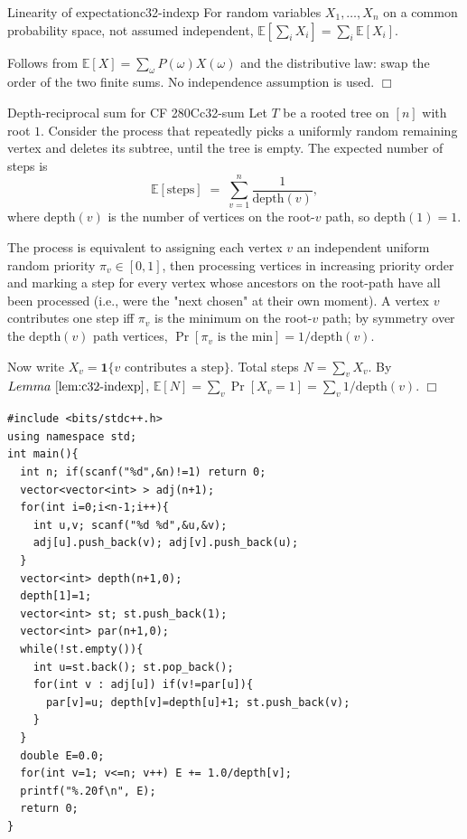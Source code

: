\begin{lemma}{Linearity of expectation}{c32-indexp}
For random variables \(X_1,\dots,X_n\) on a common probability space, not
assumed independent, \(\mathbb{E}\!\left[\sum_i X_i\right]=\sum_i
\mathbb{E}[X_i]\).
\end{lemma}

\begin{proofbox}
Follows from \(\mathbb{E}[X]=\sum_{\omega} P(\omega) X(\omega)\) and the
distributive law: swap the order of the two finite sums.  No independence
assumption is used. \(\Box\)
\end{proofbox}

\begin{theorem}{Depth-reciprocal sum for CF 280C}{c32-sum}
Let \(T\) be a rooted tree on \([n]\) with root \(1\).  Consider the process
that repeatedly picks a uniformly random remaining vertex and deletes its
subtree, until the tree is empty.  The expected number of steps is
\[
  \mathbb{E}[\text{steps}] \;=\; \sum_{v=1}^{n} \frac{1}{\mathrm{depth}(v)},
\]
where \(\mathrm{depth}(v)\) is the number of vertices on the root-\(v\)
path, so \(\mathrm{depth}(1)=1\).
\end{theorem}

\begin{proofbox}
The process is equivalent to assigning each vertex \(v\) an independent
uniform random priority \(\pi_v\in[0,1]\), then processing vertices in
increasing priority order and marking a step for every vertex whose
ancestors on the root-path have all been processed (i.e., were the "next
chosen" at their own moment).  A vertex \(v\) contributes one step iff
\(\pi_v\) is the minimum on the root-\(v\) path; by symmetry over the
\(\mathrm{depth}(v)\) path vertices, \(\Pr[\pi_v\text{ is the min}]=1/\mathrm{depth}(v)\).

Now write \(X_v = \mathbf{1}\{v\text{ contributes a step}\}\).  Total steps
\(N = \sum_v X_v\).  By \(\lemref{c32-indexp}\),
\(\mathbb{E}[N] = \sum_v \Pr[X_v=1] = \sum_v 1/\mathrm{depth}(v)\). \(\Box\)
\end{proofbox}

\begin{lstlisting}[caption={Root a tree at 1 and compute depth via a single DFS or BFS; the expectation is the sum of reciprocal depths. Iterative DFS with an explicit stack avoids recursion-depth issues on n up to 1e5. ASCII only, identifiers without underscores}, label={lst:c32-depth}]
#include <bits/stdc++.h>
using namespace std;
int main(){
  int n; if(scanf("%d",&n)!=1) return 0;
  vector<vector<int> > adj(n+1);
  for(int i=0;i<n-1;i++){
    int u,v; scanf("%d %d",&u,&v);
    adj[u].push_back(v); adj[v].push_back(u);
  }
  vector<int> depth(n+1,0);
  depth[1]=1;
  vector<int> st; st.push_back(1);
  vector<int> par(n+1,0);
  while(!st.empty()){
    int u=st.back(); st.pop_back();
    for(int v : adj[u]) if(v!=par[u]){
      par[v]=u; depth[v]=depth[u]+1; st.push_back(v);
    }
  }
  double E=0.0;
  for(int v=1; v<=n; v++) E += 1.0/depth[v];
  printf("%.20f\n", E);
  return 0;
}
\end{lstlisting}

